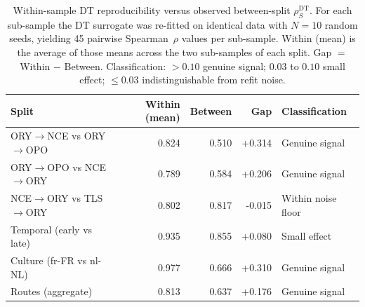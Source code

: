 \begin{table}
\caption{Within-sample DT reproducibility versus observed between-split $\rho_S^{\mathrm{DT}}$. For each sub-sample the DT surrogate was re-fitted on identical data with $N=10$ random seeds, yielding 45 pairwise Spearman~$\rho$ values per sub-sample. Within (mean) is the average of those means across the two sub-samples of each split. Gap $=$ Within $-$ Between. Classification: $>0.10$ genuine signal; $0.03$ to $0.10$ small effect; $\leq 0.03$ indistinguishable from refit noise.}
\label{tab:bootstrap_dt}
\begin{tabular}{lrrrl}
\toprule
Split & Within (mean) & Between & Gap & Classification \\
\midrule
ORY$\to$NCE vs ORY$\to$OPO & 0.824 & 0.510 & +0.314 & Genuine signal \\
ORY$\to$OPO vs NCE$\to$ORY & 0.789 & 0.584 & +0.206 & Genuine signal \\
NCE$\to$ORY vs TLS$\to$ORY & 0.802 & 0.817 & -0.015 & Within noise floor \\
Temporal (early vs late) & 0.935 & 0.855 & +0.080 & Small effect \\
Culture (fr-FR vs nl-NL) & 0.977 & 0.666 & +0.310 & Genuine signal \\
Routes (aggregate) & 0.813 & 0.637 & +0.176 & Genuine signal \\
\bottomrule
\end{tabular}
\end{table}

